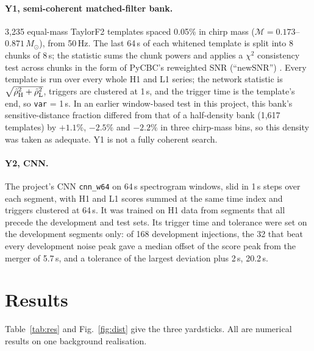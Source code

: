 \documentclass[11pt]{article}
\newcommand{\Msun}{\ensuremath{M_\odot}}
\begin{document}
\paragraph{Y1, semi-coherent matched-filter bank.} 3,235 equal-mass TaylorF2 templates spaced 0.05\% in chirp mass
($\mathcal{M} = 0.173$--$0.871\,\Msun$), from 50\,Hz. The last 64\,s of each whitened template is split into 8 chunks
of 8\,s; the statistic sums the chunk powers and applies a $\chi^2$ consistency test across chunks in the form of
PyCBC's reweighted SNR (``newSNR'') \cite{allen2005,babak2013,pycbc_usman}. Every template is run over every whole H1
and L1 series; the network statistic is $\sqrt{\hat\rho_{\rm H}^2 + \hat\rho_{\rm L}^2}$, triggers are clustered at
1\,s, and the trigger time is the template's end, so \texttt{var} = 1\,s. In an earlier window-based test in this
project, this bank's sensitive-distance fraction differed from that of a half-density bank (1,617 templates) by
$+1.1\%$, $-2.5\%$ and $-2.2\%$ in three chirp-mass bins, so this density was taken as adequate. Y1 is not a fully coherent search.

\paragraph{Y2, CNN.} The project's CNN \texttt{cnn\_w64} on 64\,s spectrogram windows, slid in 1\,s steps over each
segment, with H1 and L1 scores summed at the same time index and triggers clustered at 64\,s. It was trained on H1
data from segments that all precede the development and test sets. Its trigger time and tolerance were set on the
development segments only: of 168 development injections, the 32 that beat every development noise peak gave a
median offset of the score peak from the merger of 5.7\,s, and a tolerance of the largest deviation plus 2\,s,
20.2\,s.

\section{Results}
Table~\ref{tab:res} and Fig.~\ref{fig:dist} give the three yardsticks. All are numerical results on one background
realisation.
\end{document}
